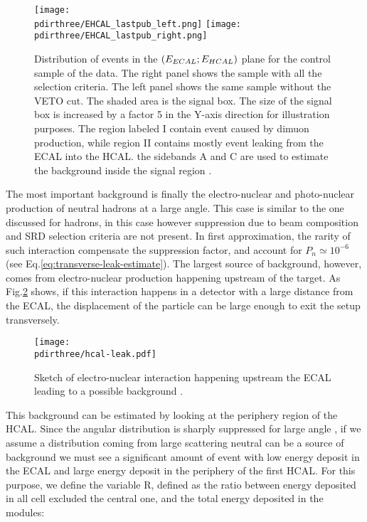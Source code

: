 \begin{figure}[bth!]
  \centering
  \texttt{[image: \\pdirthree/EHCAL\_lastpub\_left.png]}
  \texttt{[image: \\pdirthree/EHCAL\_lastpub\_right.png]}
  \caption[ECAL vs HCAL events band]{Distribution of events in the $(E_{ECAL};E_{HCAL})$ plane for the control sample of the data. The right panel shows the sample with all the selection criteria. The left panel shows the same sample without the VETO cut. The shaded area is the signal box. The size of the signal box is increased by a factor 5 in the Y-axis direction for illustration purposes. The region labeled I contain event caused by dimuon production, while region II contains mostly event leaking from the ECAL into the HCAL. the sidebands A and C are used to estimate the background inside the signal region \cite{NA64:2019imj}.}
  \label{fig:ehcal-bkg-bands}
\end{figure}

The most important background is finally the electro-nuclear and photo-nuclear production of neutral hadrons at a large angle. This case is similar to the one discussed for hadrons, in this case however suppression due to beam composition and SRD selection criteria are not present. In first approximation, the rarity of such interaction compensate the suppression factor, and account for $P_n \simeq 10^{-6}$ (see Eq.\ref{eq:transverse-leak-estimate}).
The largest source of background, however, comes from electro-nuclear production happening upstream of the target. As Fig.\ref{fig:eh-prod-sketch} shows, if this interaction happens in a detector with a large distance from the ECAL, the displacement of the particle can be large enough to exit the setup transversely. 


\begin{figure}[bth!]
  \centering
  \texttt{[image: \\pdirthree/hcal-leak.pdf]}
  \caption[upstream electro-hadron production upstream]{Sketch of electro-nuclear interaction happening upstream the ECAL leading to a possible background \cite{pdegen-thesis}.}
  \label{fig:eh-prod-sketch}
\end{figure}

This background can be estimated by looking at the periphery region of the HCAL. Since the angular distribution is sharply suppressed for large angle \cite{AUTIERO1998285,GNINENKO1998583}, if we assume a distribution coming from large scattering neutral can be a source of background we must see a significant amount of event with low energy deposit in the ECAL and large energy deposit in the periphery of the first HCAL. For this purpose, we define the variable R, defined as the ratio between energy deposited in all cell excluded the central one, and the total energy deposited in the modules:

